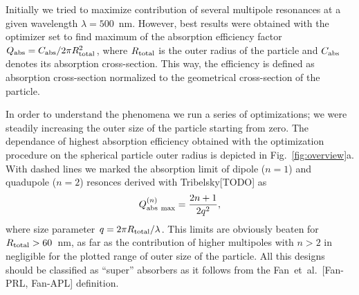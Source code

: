 \documentclass[aps,prl,twocolumn,showpacs,superscriptaddress,groupedaddress]{revtex4-1}
\begin{document}
Initially we tried to maximize contribution of several multipole
resonances at a given wavelength $\lambda=500$~nm.  However, best
results were obtained with the optimizer set to find maximum of the
absorption efficiency factor $Q_{\rm abs}=C_{\rm abs}/2\pi R_{\rm
  total}^2$, where $R_{\rm total}$ is the outer radius of the particle
and $C_{\rm abs}$ denotes its absorption cross-section.  This way, the
efficiency is defined as absorption cross-section normalized to the
geometrical cross-section of the particle. 

\begin{figure}
\end{figure}
In order to understand the phenomena we run a series of optimizations;
we were steadily increasing the outer size of the particle starting
from zero.  The dependance of highest absorption efficiency obtained
with the optimization procedure on the spherical particle outer radius
is depicted in Fig.~\ref{fig:overview}a.  With dashed lines we marked
the absorption limit of dipole ($n=1$) and quadupole ($n=2$) resonces
derived with Tribelsky[TODO] as $$Q^{(n)}_{\rm abs\
  max}=\frac{2n+1}{2q^2},$$ where size parameter $q=2\pi R_{\rm
  total}/\lambda$.  This limits are obviously beaten for $R_{\rm
  total}>60$~nm, as far as the contribution of higher multipoles with
$n>2$ in negligible for the plotted range of outer size of the
particle.  All this designs should be classified as ``super''
absorbers as it follows from the Fan~et~al.~[Fan-PRL, Fan-APL]
definition.
\end{document}
